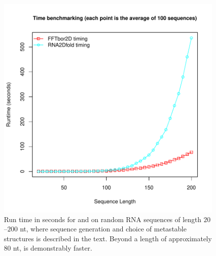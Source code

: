 \begin{figure}[!ht]
\centering
\includegraphics[width=.9\textwidth]{Figures/FFTbor2D/ffttwoRtwofoldTiming.pdf}
\caption[Run time in seconds for \rnatwofold and \ffttwo on random
RNA sequences of length $20$--$200$ nt]{
Run time in seconds for \rnatwofold and \ffttwo on random
RNA sequences of length $20$--$200$ nt, where sequence generation and
choice of metastable structures \strAB is described in the text.
Beyond a length of approximately $80$ nt, \ffttwo is demonstrably
faster.
}
\label{fig:ffttwo:ffttwoRtwofoldTiming}
\end{figure}

